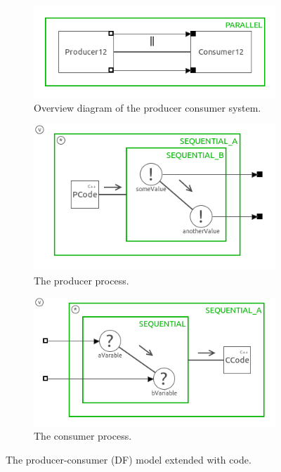 \documentclass[a4paper,twoside,11pt]{article}
\begin{document}
\begin{figure}
 \centering
 \begin{subfigure}{\textwidth}
  \centering
  \includegraphics[scale=0.8]{./images/1_2-SystemDF+_main.png}
  \caption{Overview diagram of the producer consumer system.}
 \end{subfigure}
 \begin{subfigure}{0.5\textwidth}
  \centering
	\includegraphics[width=\textwidth]{./images/1_2-SystemDF+_prod.png}
	\caption{The producer process.}
 \end{subfigure}%
 \begin{subfigure}{0.5\textwidth}
  \centering
	\includegraphics[width=\textwidth]{./images/1_2-SystemDF+_cons.png}
	\caption{The consumer process.}
 \end{subfigure}
 \caption{The producer-consumer (DF) model extended with code.}
 \label{fig:SystemDF+}
\end{figure}
\end{document}
